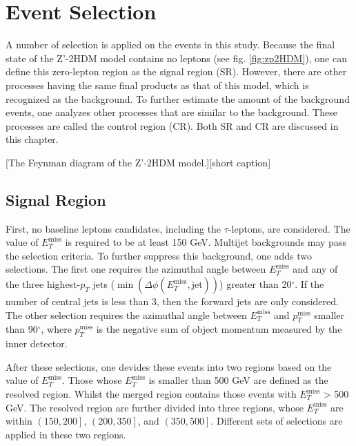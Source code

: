 \documentclass[class=NCU_thesis, crop=false]{standalone}
\begin{document}
\chapter{Event Selection}
A number of selection is applied on the events in this study. Because the final state of the Z'-2HDM model contains no leptons (see fig. \ref{fig:zp2HDM}), one can define this zero-lepton region as the signal region (SR). However, there are other processes having the same final products as that of this model, which is recognized as the background. To further estimate the amount of the background events, one analyzes other processes that are similar to the background. These processes are called the control region (CR). Both SR and CR are discussed in this chapter.

[The Feynman diagram of the Z'-2HDM model.][short caption]

\section{Signal Region}
	First, no baseline leptons candidates, including the $\tau$-leptons, are considered. The value of $E_T^{\mathrm{miss}}$ is required to be at least 150 GeV. Multijet backgrounds may pass the selection criteria. To further suppress this background, one adds two selections. The first one requires the azimuthal angle between $E_T^{\mathrm{miss}}$ and any of the three highest-$p_T$ jets ($\min(\Delta \phi(E_T^{\mathrm{miss}}, \mathrm{jet}))$) greater than 20$^\circ$. If the number of central jets is less than 3, then the forward jets are only considered. The other selection requires the azimuthal angle between $E_T^{\mathrm{miss}}$ and $p_T^{\mathrm{miss}}$ smaller than 90$^\circ$, where $p_T^{\mathrm{miss}}$ is the negative sum of object momentum measured by the inner detector.

	After these selections, one devides these events into two regions based on the value of $E_T^{\mathrm{miss}}$. Those whose $E_T^{\mathrm{miss}}$ is smaller than 500 GeV are defined as the resolved region. Whilst the merged region contains those events with $E_T^{\mathrm{miss}}$ > 500 GeV. The resolved region are further divided into three regions, whose $E_T^{\mathrm{miss}}$ are within $\left(150, 200\right]$, $\left(200, 350\right]$, and $\left(350, 500\right]$. Different sets of selections are applied in these two regions.
\end{document}
